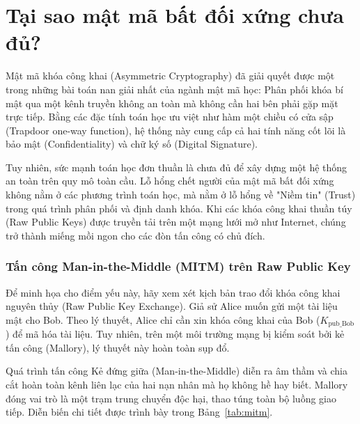 \section{Tại sao mật mã bất đối xứng chưa đủ?}
\label{sec:2.3}

Mật mã khóa công khai (Asymmetric Cryptography) đã giải quyết được một trong những bài toán nan giải nhất của ngành mật mã học: Phân phối khóa bí mật qua một kênh truyền không an toàn mà không cần hai bên phải gặp mặt trực tiếp. Bằng các đặc tính toán học ưu việt như hàm một chiều có cửa sập (Trapdoor one-way function), hệ thống này cung cấp cả hai tính năng cốt lõi là bảo mật (Confidentiality) và chữ ký số (Digital Signature). 

Tuy nhiên, sức mạnh toán học đơn thuần là chưa đủ để xây dựng một hệ thống an toàn trên quy mô toàn cầu. Lỗ hổng chết người của mật mã bất đối xứng không nằm ở các phương trình toán học, mà nằm ở lỗ hổng về "Niềm tin" (Trust) trong quá trình phân phối và định danh khóa. Khi các khóa công khai thuần túy (Raw Public Keys) được truyền tải trên một mạng lưới mở như Internet, chúng trở thành miếng mồi ngon cho các đòn tấn công có chủ đích.

\subsubsection*{Tấn công Man-in-the-Middle (MITM) trên Raw Public Key}

Để minh họa cho điểm yếu này, hãy xem xét kịch bản trao đổi khóa công khai nguyên thủy (Raw Public Key Exchange). Giả sử Alice muốn gửi một tài liệu mật cho Bob. Theo lý thuyết, Alice chỉ cần xin khóa công khai của Bob ($K_{\mathrm{pub\_Bob}}$) để mã hóa tài liệu. Tuy nhiên, trên một môi trường mạng bị kiểm soát bởi kẻ tấn công (Mallory), lý thuyết này hoàn toàn sụp đổ.

Quá trình tấn công Kẻ đứng giữa (Man-in-the-Middle) diễn ra âm thầm và chia cắt hoàn toàn kênh liên lạc của hai nạn nhân mà họ không hề hay biết. Mallory đóng vai trò là một trạm trung chuyển độc hại, thao túng toàn bộ luồng giao tiếp. Diễn biến chi tiết được trình bày trong Bảng~\ref{tab:mitm}.

